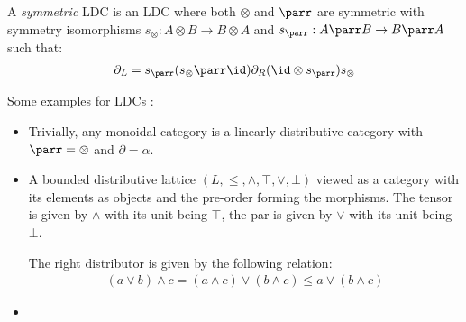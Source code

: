 \documentclass[DIN, pagenumber=false, fontsize=11pt, parskip=half, colorinlistoftodos, svgnames]{scrartcl}
\begin{document}
\begin{definition}
\begin{itemize}
\begin{center}
				\end{center}
		\end{itemize}
		
		A \emph{symmetric} LDC is an LDC where both $\otimes$ and $\parr$ are symmetric with symmetry isomorphisms 
		$s_\otimes : A \otimes B \rightarrow B \otimes A $ 
		and 
		$s_\parr : A \parr B \rightarrow B \parr A $ 
		such that:
		\begin{align*}
			\partial_L = s_\parr (s_\otimes \parr \id) \partial_R (\id \otimes s_\parr) s_\otimes
		\end{align*}
	\end{definition}
	
	\begin{example}
		Some examples for LDCs \cite[Definition 2.2]{srinavsan-thesis}:
		\begin{itemize}
			\item 
				Trivially, any monoidal category is a linearly distributive category with $\parr = \otimes$ and $\partial = \alpha$.
			\item 
				A bounded distributive lattice $(L, \leq, \wedge, \top, \vee, \bot ) $ viewed as a category with its elements as objects and the pre-order forming the morphisms. The tensor is given by $\wedge$ with its unit being $\top$, the par is given by $\vee$ with its unit being $\bot$.
				
				The right distributor is given by the following relation:
				\begin{align*}
					(a \vee b) \wedge c = (a \wedge c) \vee (b \wedge c) \leq a \vee (b \wedge c)
				\end{align*}
				
			\item 
		\end{itemize}
	\end{example}
	
\end{document}
